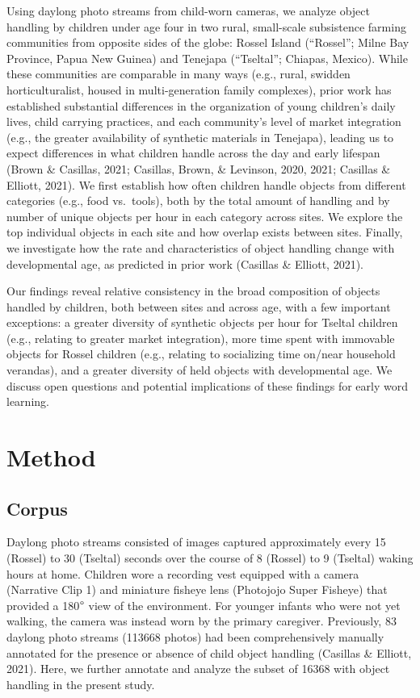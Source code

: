 \documentclass[10pt, letterpaper]{article}
\begin{document}
Using daylong photo streams from child-worn cameras, we analyze object
handling by children under age four in two rural, small-scale
subsistence farming communities from opposite sides of the globe: Rossel
Island (``Rossel''; Milne Bay Province, Papua New Guinea) and Tenejapa
(``Tseltal''; Chiapas, Mexico). While these communities are comparable
in many ways (e.g., rural, swidden horticulturalist, housed in
multi-generation family complexes), prior work has established
substantial differences in the organization of young children's daily
lives, child carrying practices, and each community's level of market
integration (e.g., the greater availability of synthetic materials in
Tenejapa), leading us to expect differences in what children handle
across the day and early lifespan (Brown \& Casillas, 2021; Casillas,
Brown, \& Levinson, 2020, 2021; Casillas \& Elliott, 2021). We first
establish how often children handle objects from different categories
(e.g., food vs.~tools), both by the total amount of handling and by
number of unique objects per hour in each category across sites. We
explore the top individual objects in each site and how overlap exists
between sites. Finally, we investigate how the rate and characteristics
of object handling change with developmental age, as predicted in prior
work (Casillas \& Elliott, 2021).

Our findings reveal relative consistency in the broad composition of
objects handled by children, both between sites and across age, with a
few important exceptions: a greater diversity of synthetic objects per
hour for Tseltal children (e.g., relating to greater market
integration), more time spent with immovable objects for Rossel children
(e.g., relating to socializing time on/near household verandas), and a
greater diversity of held objects with developmental age. We discuss
open questions and potential implications of these findings for early
word learning.

\hypertarget{method}{%
\section{Method}\label{method}}

\hypertarget{corpus}{%
\subsection{Corpus}\label{corpus}}

Daylong photo streams consisted of images captured approximately every
15 (Rossel) to 30 (Tseltal) seconds over the course of 8 (Rossel) to 9
(Tseltal) waking hours at home. Children wore a recording vest equipped
with a camera (Narrative Clip 1) and miniature fisheye lens (Photojojo
Super Fisheye) that provided a 180\(\text{\textdegree}\) view of the
environment. For younger infants who were not yet walking, the camera
was instead worn by the primary caregiver. Previously, 83 daylong photo
streams (113668 photos) had been comprehensively manually annotated for
the presence or absence of child object handling (Casillas \& Elliott,
2021). Here, we further annotate and analyze the subset of 16368 with
object handling in the present study.
\end{document}
